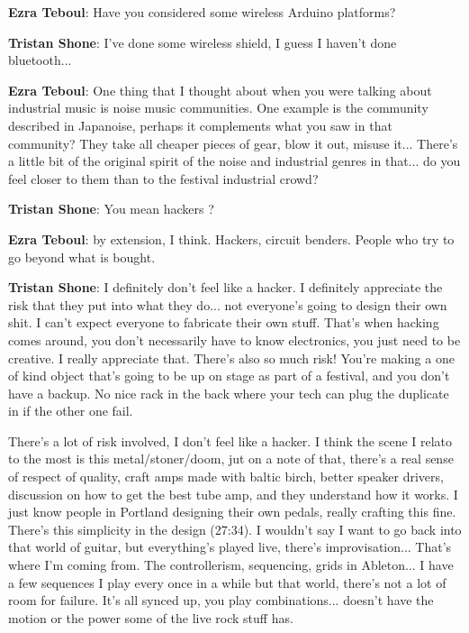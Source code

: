 \textbf{Ezra Teboul}: Have you considered some wireless Arduino platforms? 

\textbf{Tristan Shone}: I've done some wireless shield, I guess I haven't done bluetooth...

\textbf{Ezra Teboul}: One thing that I thought about when you were talking about industrial music is noise music communities. One example is the community described in Japanoise, perhaps it complements what you saw in that community? They take all cheaper pieces of gear, blow it out, misuse it... There's a little bit of the original spirit of the noise and industrial genres in that... do you feel closer to them than to the festival industrial crowd? 

\textbf{Tristan Shone}: You mean hackers ? 

\textbf{Ezra Teboul}: by extension, I think. Hackers, circuit benders. People who try to go beyond what is bought. 

\textbf{Tristan Shone}: I definitely don't feel like a hacker. I definitely appreciate the risk that they put into what they do... not everyone's going to design their own shit. I can't expect everyone to fabricate their own stuff. That's when hacking comes around, you don't necessarily have to know electronics, you just need to be creative. I really appreciate that. There's also so much risk! You're making a one of kind object that's going to be up on stage as part of a festival, and you don't have a backup. No nice rack in the back where your tech can plug the duplicate in if the other one fail. 

There's a lot of risk involved, I don't feel like a hacker. I think the scene I relato to the most is this metal/stoner/doom, jut on a note of that, there's a real sense of respect of quality, craft amps made with baltic birch, better speaker  drivers, discussion on how to get the best tube amp, and they understand how it works. I just know people in Portland designing their own pedals, really crafting this fine. There's this simplicity in the design (27:34). I wouldn't say I want to go back into that world of guitar, but everything's played live, there's improvisation... That's where I'm coming from. The controllerism, sequencing, grids in Ableton... I have a few sequences I play every once in a while but that world, there's not a lot of room for failure. It's all synced up, you play combinations... doesn't have the motion or the power some of the live rock stuff has. 


